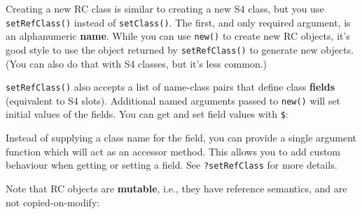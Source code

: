 Creating a new RC class is similar to creating a new S4 class, but you
use \texttt{setRefClass()} instead of \texttt{setClass()}. The first,
and only required argument, is an alphanumeric \textbf{name}. While you
can use \texttt{new()} to create new RC objects, it's good style to use
the object returned by \texttt{setRefClass()} to generate new objects.
(You can also do that with S4 classes, but it's less common.)

\begin{Shaded}
\begin{Highlighting}[]
\StringTok{ }\NormalTok{(}\NormalTok{)}
\NormalTok{()}
\end{Highlighting}
\end{Shaded}

\texttt{setRefClass()} also accepts a list of name-class pairs that
define class \textbf{fields} (equivalent to S4 slots). Additional named
arguments passed to \texttt{new()} will set initial values of the
fields. You can get and set field values with \texttt{\$}:

\begin{Shaded}
\begin{Highlighting}[]
\StringTok{ }\NormalTok{(}\NormalTok{,}
   \NormalTok{(} \NormalTok{))}

\StringTok{ }\NormalTok{(} \NormalTok{)}
\StringTok{ }
\end{Highlighting}
\end{Shaded}

Instead of supplying a class name for the field, you can provide a
single argument function which will act as an accessor method. This
allows you to add custom behaviour when getting or setting a field. See
\texttt{?setRefClass} for more details.

Note that RC objects are \textbf{mutable}, i.e., they have reference
semantics, and are not copied-on-modify:

\begin{Shaded}
\begin{Highlighting}[]
\StringTok{ }
\StringTok{ }
\end{Highlighting}
\end{Shaded}

